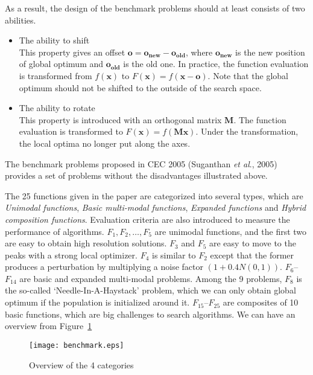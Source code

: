 As a result, the design of the benchmark problems should at least consists of two
abilities.
\begin{itemize}
	\item The ability to shift\\
		This property gives an offset $\mathbf{o} = \mathbf{o_{new}} -
		\mathbf{o_{old}}$, where $\mathbf{o_{new}}$ is the new position of global optimum
		and $\mathbf{o_{old}}$ is the old one. In practice, the function
		evaluation is transformed from $f(\mathbf{x})$ to $F(\mathbf{x}) =
		f(\mathbf{x} - \mathbf{o})$. Note that the global optimum should not be
		shifted to the outside of the search space.
	\item The ability to rotate\\
		This property is introduced with an orthogonal matrix $\mathbf{M}$. The function
		evaluation is transformed to $F(\mathbf{x}) = f(\mathbf{Mx})$. Under the
		transformation, the local optima no longer put along the axes.
\end{itemize}

The benchmark problems proposed in CEC 2005 (Suganthan \textit{et al}.,
2005)~\cite{suganthan2005problem}
provides a set of problems without the disadvantages illustrated above.

The 25 functions given in the paper are categorized into several types, which are
\emph{Unimodal functions}, \emph{Basic multi-modal functions}, \emph{Expanded functions} and \emph{Hybrid composition functions}. Evaluation criteria are also introduced to measure the performance of algorithms. 
$F_1, F_2, \ldots, F_5$ are unimodal functions, and the first two are
easy to obtain high resolution solutions. $F_3$ and $F_5$ are easy to
move to the peaks with a strong local optimizer. $F_4$ is similar to
$F_2$ except that the former produces a perturbation by multiplying
a noise factor $(1+0.4N(0,1))$. 
$F_6$--$F_{14}$ are basic and expanded multi-modal problems. Among the 9
problems, $F_8$ is the so-called `Needle-In-A-Haystack' problem, which we can only obtain global optimum if the population is initialized around it. 
$F_{15}$--$F_{25}$ are composites of 10 basic functions, which are big challenges to search algorithms.
We can have an overview from Figure~\ref{fig:25testproblems}

\begin{figure}[htpb]
  \centering
  \texttt{[image: benchmark.eps]}
  \caption{Overview of the 4 categories}
  \label{fig:25testproblems}
\end{figure}

